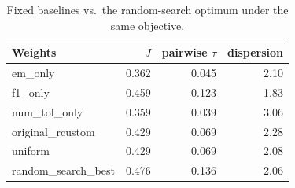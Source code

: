 \begin{table}[t]
\centering
\small
\caption{Fixed baselines vs.\ the random-search optimum under the same objective.}
\label{tab:baselines}

\begin{tabular}{lrrr}
\toprule
Weights & $J$ & pairwise $\tau$ & dispersion \\
\midrule
em\_only & 0.362 & 0.045 & 2.10 \\
f1\_only & 0.459 & 0.123 & 1.83 \\
num\_tol\_only & 0.359 & 0.039 & 3.06 \\
original\_rcustom & 0.429 & 0.069 & 2.28 \\
uniform & 0.429 & 0.069 & 2.08 \\
random\_search\_best & 0.476 & 0.136 & 2.06 \\
\bottomrule
\end{tabular}

\end{table}